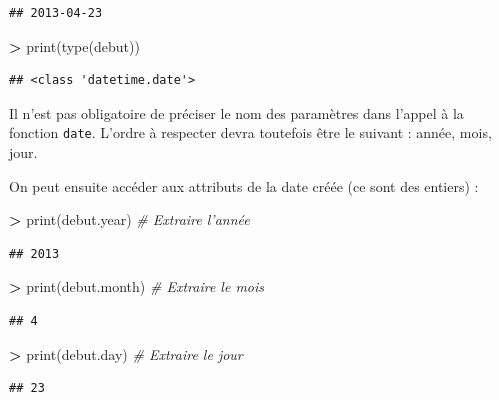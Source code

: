 \documentclass[12pt,]{book}
\newenvironment{Shaded}{\begin{snugshade}}{\end{snugshade}}
\newcommand{\CommentTok}[1]{\textcolor[rgb]{0.56,0.35,0.01}{\textit{#1}}}
\newcommand{\OperatorTok}[1]{\textcolor[rgb]{0.81,0.36,0.00}{\textbf{#1}}}
\newcommand{\BuiltInTok}[1]{#1}
\newcommand{\NormalTok}[1]{#1}
\numberwithin{equation}{section}
\numberwithin{countremarque}{section}
\let\BeginKnitrBlock\begin \let\EndKnitrBlock\end
\begin{document}
\begin{lstlisting}
## 2013-04-23
\end{lstlisting}

\begin{Shaded}
\begin{Highlighting}[]
\OperatorTok{>} \BuiltInTok{print}\NormalTok{(}\BuiltInTok{type}\NormalTok{(debut))}
\end{Highlighting}
\end{Shaded}

\begin{lstlisting}
## <class 'datetime.date'>
\end{lstlisting}

\BeginKnitrBlock{remarque}
Il n'est pas obligatoire de préciser le nom des paramètres dans l'appel
à la fonction \texttt{date}. L'ordre à respecter devra toutefois être le
suivant : année, mois, jour.
\EndKnitrBlock{remarque}

On peut ensuite accéder aux attributs de la date créée (ce sont des
entiers) :

\begin{Shaded}
\begin{Highlighting}[]
\OperatorTok{>} \BuiltInTok{print}\NormalTok{(debut.year) }\CommentTok{# Extraire l'année}
\end{Highlighting}
\end{Shaded}

\begin{lstlisting}
## 2013
\end{lstlisting}

\begin{Shaded}
\begin{Highlighting}[]
\OperatorTok{>} \BuiltInTok{print}\NormalTok{(debut.month) }\CommentTok{# Extraire le mois}
\end{Highlighting}
\end{Shaded}

\begin{lstlisting}
## 4
\end{lstlisting}

\begin{Shaded}
\begin{Highlighting}[]
\OperatorTok{>} \BuiltInTok{print}\NormalTok{(debut.day) }\CommentTok{# Extraire le jour}
\end{Highlighting}
\end{Shaded}

\begin{lstlisting}
## 23
\end{lstlisting}
\end{document}
